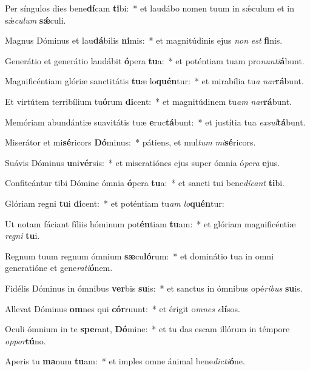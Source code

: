 \item Per síngulos dies bene\textbf{dí}cam \textbf{ti}bi:~* et laudábo nomen tuum in sǽculum et in sǽ\tinyhspace\textit{culum} \textbf{sǽ}culi.
\item Magnus Dóminus et lau\textbf{dá}bilis \textbf{ni}mis:~* et magnitúdinis ejus \textit{non} \textit{est} \textbf{fi}nis.
\item Generátio et generátio laudábit \textbf{ó}pera \textbf{tu}a:~* et poténtiam tuam pro\textit{nunti}\textbf{á}bunt.
\item Magnificéntiam glóriæ sanctitátis \textbf{tu}æ lo\textbf{quén}tur:~* et mirabília tu\tinyhspace\textit{a} \textit{nar}\textbf{rá}bunt.
\item Et virtútem terribílium tu\textbf{ó}rum \textbf{di}cent:~* et magnitúdinem tu\tinyhspace\textit{am} \textit{nar}\textbf{rá}bunt.
\item Memóriam abundántiæ suavitátis tuæ \textbf{e}ruc\textbf{tá}bunt:~* et justítia tua \textit{exsul}\textbf{tá}bunt.
\item Miserátor et mi\textbf{sé}ricors \textbf{Dó}minus:~* pátiens, et mul\textit{tum} \textit{mi}\textbf{sé}ricors.
\item Suávis Dóminus \textbf{u}ni\textbf{vér}sis:~* et miseratiónes ejus super ómnia ó\textit{pera} \textbf{e}jus.
\item Confiteántur tibi Dómine ómnia \textbf{ó}pera \textbf{tu}a:~* et san\-cti tui bene\tinyhspace\textit{dícant} \textbf{ti}bi.
\item Glóriam regni \textbf{tu}i \textbf{di}cent:~* et poténtiam tu\tinyhspace\textit{am} \textit{lo}\textbf{quén}tur:
\item Ut notam fáciant fíliis hóminum pot\textbf{én}tiam \textbf{tu}am:~* et glóriam magnificéntiæ \textit{regni} \textbf{tu}i.
\item Regnum tuum regnum ó\-mnium \textbf{sæ}cu\textbf{ló}rum:~* et dominátio tua in o\-mni generatióne et gene\textit{rati}\textbf{ó}nem.
\item Fidélis Dóminus in ómnibus \textbf{ver}bis \textbf{su}is:~* et san\-ctus in ó\-mnibus opé\textit{ribus} \textbf{su}is.
\item Allevat Dóminus \textbf{om}nes qui \textbf{cór}ruunt:~* et érigit o\textit{mnes} \textit{e}\textbf{lí}sos.
\item Oculi ó\-mnium in te \textbf{spe}rant, \textbf{Dó}mine:~* et tu das escam illórum in témpore \textit{oppor}\textbf{tú}no.
\item Aperis tu \textbf{ma}num \textbf{tu}am:~* et imples omne ánimal bene\tinyhspace\textit{dicti}\textbf{ó}ne.
